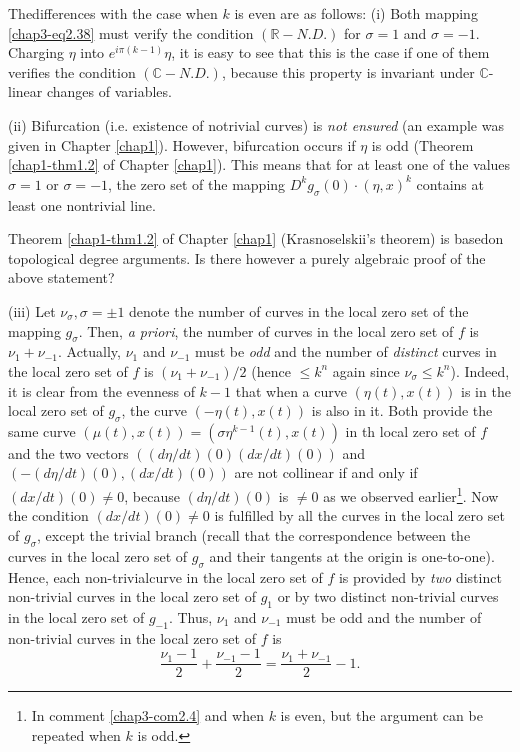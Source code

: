 The\pageoriginale differences with the case when $k$ is even are as
follows: (i) Both mapping \ref{chap3-eq2.38} must verify the
condition $(\mathbb{R}-N.D.)$ for $\sigma = 1$ and $\sigma =
-1$. Charging $\eta$ into $e^{i \pi (k-1)} \eta$, it is easy to see
that this is the case if one of them verifies the condition
$(\mathbb{C}-N.D.)$, because this property is invariant under
$\mathbb{C}$-linear changes of variables.

(ii) Bifurcation (i.e. existence of notrivial curves) is {\em not
  ensured} (an example was given in Chapter \ref{chap1}). However,
bifurcation occurs if $\eta$ is odd (Theorem \ref{chap1-thm1.2} of
Chapter \ref{chap1}). This means that for at least one of the values
$\sigma = 1$ or $\sigma = -1$, the zero set of the mapping
$D^{k}g_{\sigma}(0) \cdot (\eta, x)^{k}$ contains at least one
nontrivial line.

\begin{remark}\label{chap3-rem2.5}
Theorem \ref{chap1-thm1.2} of Chapter \ref{chap1} (Krasnoselskii's
theorem) is based\pageoriginale on topological degree arguments. Is
there however a purely algebraic proof of the above statement?
\end{remark}

(iii) Let $\nu_{\sigma}, \sigma = \pm 1$ denote the number of curves
in the local zero set of the mapping $g_{\sigma}$. Then, {\em a
  priori}, the number of curves in the local zero set of $f$ is $\nu_{1}
+ \nu_{-1}$. Actually, $\nu_{1}$ and $\nu_{-1}$ must be {\em odd} and
the number of {\em distinct} curves in the local zero set of $f$ is
$(\nu_{1} + \nu_{-1} )/ 2$ (hence $\leq k^{n}$ again since
  $\nu_{\sigma} \leq k^{n}$). Indeed, it is clear from the evenness of
  $k - 1$ that when a curve $(\eta(t), x(t))$ is in the local zero set
  of $g_{\sigma}$, the curve $(-\eta(t), x(t))$ is also in it. Both
  provide the same curve $(\mu(t), x (t)) = (\sigma \eta^{k-1}(t),
  x(t))$ in th local zero set of $f$ and the two vectors $((d\eta/dt)(0)
  (dx/dt)(0))$ and $(-(d\eta/dt)(0), (dx/dt)(0))$ are not collinear if
  and only if $(dx/dt)(0)\neq 0$, because $(d\eta/dt)(0)$ is $\neq 0$
  as we observed earlier\footnote{In comment \ref{chap3-com2.4} and
    when $k$ is even, but the argument can be repeated when $k$ is
    odd.}. Now the condition $(dx/dt)(0) \neq 0$ is fulfilled by all
  the curves in the local zero set of $g_{\sigma}$, except the trivial
  branch (recall that the correspondence between the curves in the
  local zero set of $g_{\sigma}$ and their tangents at the origin is
  one-to-one). Hence, each non-trivialcurve in the local zero set of $f$
  is provided by {\em two} distinct non-trivial curves in the local
  zero set of $g_{1}$ or by two distinct non-trivial curves in the
  local zero set of $g_{-1}$. Thus, $\nu_{1}$ and $\nu_{-1}$ must be
  odd and the number of non-trivial curves in the local zero set of $f$
  is
$$ 
\frac{\nu_{1} - 1}{2} + \frac{\nu_{-1}-1}{2} = \frac{\nu_{1} +
  \nu_{-1}}{2}  -1. 
$$

